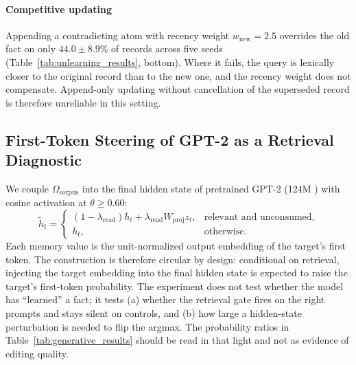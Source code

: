 \documentclass[preprint,12pt]{elsarticle}
\newcommand{\Om}{\Omega}
\begin{document}
\paragraph{Competitive updating}
Appending a contradicting atom with recency weight $w_{\mathrm{new}} = 2.5$ overrides the old fact on only $44.0\pm8.9\%$ of records across five seeds (Table~\ref{tab:unlearning_results}, bottom). Where it fails, the query is lexically closer to the original record than to the new one, and the recency weight does not compensate. Append-only updating without cancellation of the superseded record is therefore unreliable in this setting.

\subsection{First-Token Steering of GPT-2 as a Retrieval Diagnostic}
\label{sec:generative}

We couple $\Om_{\mathrm{corpus}}$ into the final hidden state of pretrained GPT-2 (124M \cite{radford2019language}) with cosine activation at $\theta \ge 0.60$:
\[
  \tilde{h}_t =
  \begin{cases}
    (1-\lambda_{\mathrm{read}})h_t + \lambda_{\mathrm{read}}W_{\mathrm{proj}}z_t,
      & \text{relevant and unconsumed},\\
    h_t, & \text{otherwise}.
  \end{cases}
\]
Each memory value is the unit-normalized output embedding of the target's first token. The construction is therefore circular by design: conditional on retrieval, injecting the target embedding into the final hidden state is expected to raise the target's first-token probability. The experiment does not test whether the model has ``learned'' a fact; it tests (a) whether the retrieval gate fires on the right prompts and stays silent on controls, and (b) how large a hidden-state perturbation is needed to flip the argmax. The probability ratios in Table~\ref{tab:generative_results} should be read in that light and not as evidence of editing quality.
\end{document}
